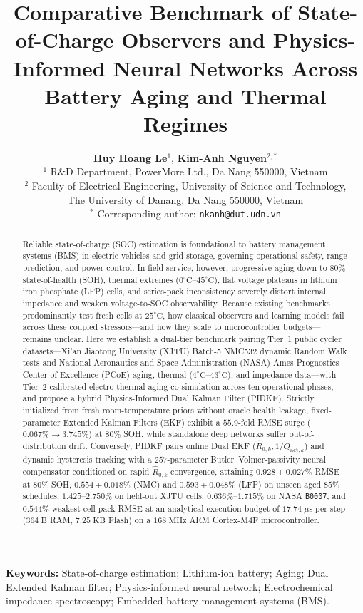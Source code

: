 \documentclass[11pt,a4paper]{article}
\title{\LARGE \textbf{Comparative Benchmark of State-of-Charge Observers and Physics-Informed Neural Networks Across Battery Aging and Thermal Regimes}}
\author{
  \textbf{Huy Hoang Le}$^{1}$, \textbf{Kim-Anh Nguyen}$^{2,*}$\\[0.6em]
  \small $^{1}$ R\&D Department, PowerMore Ltd., Da Nang 550000, Vietnam\\[0.2em]
  \small $^{2}$ Faculty of Electrical Engineering, University of Science and Technology,\\
  \small The University of Danang, Da Nang 550000, Vietnam\\[0.3em]
  \small $^{*}$ Corresponding author: \texttt{nkanh@dut.udn.vn}
}
\date{}
\providecommand{\upmu}{\mu}
\begin{document}
\maketitle

\begin{abstract}
Reliable state-of-charge (SOC) estimation is foundational to battery management systems (BMS) in electric vehicles and grid storage, governing operational safety, range prediction, and power control. In field service, however, progressive aging down to $80\%$ state-of-health (SOH), thermal extremes ($0^\circ\text{C}\text{--}45^\circ\text{C}$), flat voltage plateaus in lithium iron phosphate (LFP) cells, and series-pack inconsistency severely distort internal impedance and weaken voltage-to-SOC observability. Because existing benchmarks predominantly test fresh cells at $25^\circ\text{C}$, how classical observers and learning models fail across these coupled stressors---and how they scale to microcontroller budgets---remains unclear. Here we establish a dual-tier benchmark pairing Tier~1 public cycler datasets---Xi'an Jiaotong University (XJTU) Batch-5 NMC532 dynamic Random Walk tests and National Aeronautics and Space Administration (NASA) Ames Prognostics Center of Excellence (PCoE) aging, thermal ($4^\circ\text{C}\text{--}43^\circ\text{C}$), and impedance data---with Tier~2 calibrated electro-thermal-aging co-simulation across ten operational phases, and propose a hybrid Physics-Informed Dual Kalman Filter (PIDKF). Strictly initialized from fresh room-temperature priors without oracle health leakage, fixed-parameter Extended Kalman Filters (EKF) exhibit a $55.9$-fold RMSE surge ($0.067\% \rightarrow 3.745\%$) at $80\%$ SOH, while standalone deep networks suffer out-of-distribution drift. Conversely, PIDKF pairs online Dual EKF ($\hat{R}_{0,k}, 1/\hat{Q}_{\text{act},k}$) and dynamic hysteresis tracking with a $257$-parameter Butler--Volmer-passivity neural compensator conditioned on rapid $\hat{R}_{0,k}$ convergence, attaining $0.928\pm0.027\%$ RMSE at $80\%$ SOH, $0.554\pm0.018\%$ (NMC) and $0.593\pm0.048\%$ (LFP) on unseen aged $85\%$ schedules, $1.425\text{--}2.750\%$ on held-out XJTU cells, $0.636\%$--$1.715\%$ on NASA \texttt{B0007}, and $0.544\%$ weakest-cell pack RMSE at an analytical execution budget of $17.74\;\upmu\mathrm{s}$ per step ($364\;\mathrm{B}$ RAM, $7.25\;\mathrm{KB}$ Flash) on a $168\;\mathrm{MHz}$ ARM Cortex-M4F microcontroller.
\end{abstract}

\vspace{0.8em}
\noindent \textbf{Keywords:} State-of-charge estimation; Lithium-ion battery; Aging; Dual Extended Kalman filter; Physics-informed neural network; Electrochemical impedance spectroscopy; Embedded battery management systems (BMS).
\vspace{1.2em}
\end{document}
